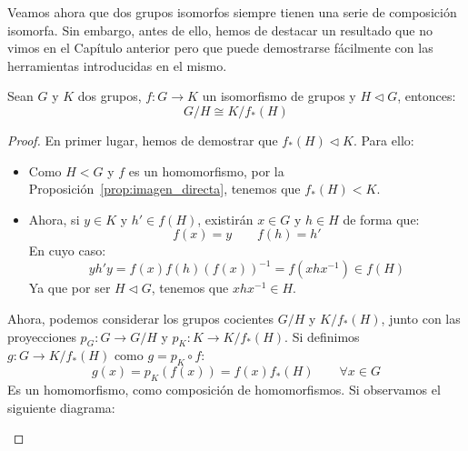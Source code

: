 \noindent
Veamos ahora que dos grupos isomorfos siempre tienen una serie de composición isomorfa. Sin embargo, antes de ello, hemos de destacar un resultado que no vimos en el Capítulo anterior pero que puede demostrarse fácilmente con las herramientas introducidas en el mismo.

\begin{lema}
    Sean $G$ y $K$ dos grupos, $f:G\to K$ un isomorfismo de grupos y $H\lhd G$, entonces:
    \begin{equation*}
        G/H \cong K/f_\ast(H)
    \end{equation*}
    \begin{proof}
        En primer lugar, hemos de demostrar que $f_\ast(H)\lhd K$. Para ello:
        \begin{itemize}
            \item Como $H<G$ y $f$ es un homomorfismo, por la Proposición~\ref{prop:imagen_directa}, tenemos que $f_\ast(H) < K$.
            \item Ahora, si $y\in K$ y $h'\in f(H)$, existirán $x\in G$ y $h\in H$ de forma que:
                \begin{equation*}
                    f(x) = y \qquad f(h) = h'
                \end{equation*}
                En cuyo caso:
                \begin{equation*}
                    yh'y = f(x)f(h){(f(x))}^{-1} = f(xhx^{-1}) \in f(H)
                \end{equation*}
                Ya que por ser $H\lhd G$, tenemos que $xhx^{-1}\in H$.
        \end{itemize}
        Ahora, podemos considerar los grupos cocientes $G/H$ y $K/f_\ast(H)$, junto con las proyecciones $p_G:G\to G/H$ y $p_K:K\to K/f_\ast(H)$. Si definimos $g:G\to K/f_\ast(H)$ como $g = p_K\circ f$:
        \begin{equation*}
            g(x) = p_K(f(x)) = f(x)f_\ast(H) \qquad \forall x\in G
        \end{equation*}
        Es un homomorfismo, como composición de homomorfismos. Si observamos el siguiente diagrama:
        \begin{figure}[H]
            \centering
\end{figure}
\end{proof}
\end{lema}
